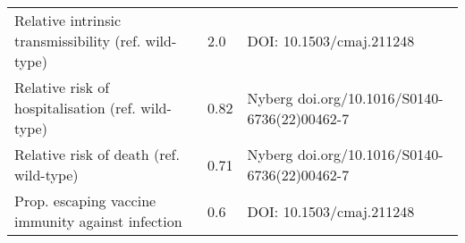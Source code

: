 \begin{table}
{\begin{tabular}{lll}
         Relative intrinsic transmissibility (ref. wild-type) &                          2.0 &                                           DOI: 10.1503/cmaj.211248 \\
            Relative risk of hospitalisation (ref. wild-type) &                         0.82 &                       Nyberg doi.org/10.1016/S0140-6736(22)00462-7 \\
                      Relative risk of death (ref. wild-type) &                         0.71 &                       Nyberg doi.org/10.1016/S0140-6736(22)00462-7 \\
            Prop. escaping vaccine immunity against infection &                          0.6 &                                           DOI: 10.1503/cmaj.211248 \\
\bottomrule
\end{tabular}}
\end{table}
